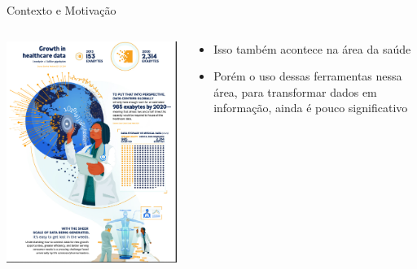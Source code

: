 \documentclass[10pt,brazil]{beamer}
\theoremstyle{definition}
\begin{document}
\begin{frame}[t,allowframebreaks]{Contexto e Motivação}
\begin{columns}
\begin{column}{0.5\textwidth}
    \end{column}
  \end{columns}
  \framebreak
  \begin{columns}
    \begin{column}{0.5\textwidth}
      \includegraphics[width=1\textwidth,height=.75\textheight]{growthhealth.png}
    \end{column}
    \begin{column}[t]{0.6\textwidth}
      \begin{itemize}
        \item[] Isso também acontece na área da saúde
        \item[] Porém o uso dessas ferramentas nessa área, para transformar dados em informação, ainda é pouco significativo
      \end{itemize}
    \end{column}
  \end{columns}
  \framebreak
  \begin{itemize}

\end{itemize}
\end{frame}
\end{document}
